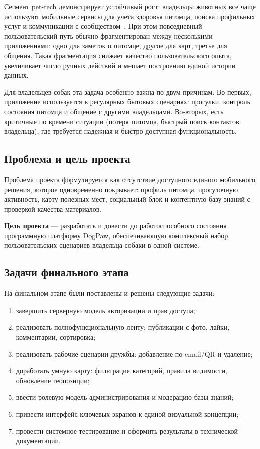 \documentclass[12pt,a4paper]{article}
\begin{document}
Сегмент pet-tech демонстрирует устойчивый рост: владельцы животных все чаще используют мобильные сервисы для учета здоровья питомца, поиска профильных услуг и коммуникации с сообществом~\cite{statista_pet}. При этом повседневный пользовательский путь обычно фрагментирован между несколькими приложениями: одно для заметок о питомце, другое для карт, третье для общения. Такая фрагментация снижает качество пользовательского опыта, увеличивает число ручных действий и мешает построению единой истории данных.

Для владельцев собак эта задача особенно важна по двум причинам. Во-первых, приложение используется в регулярных бытовых сценариях: прогулки, контроль состояния питомца и общение с другими владельцами. Во-вторых, есть критичные по времени ситуации (потеря питомца, быстрый поиск контактов владельца), где требуется надежная и быстро доступная функциональность.

\subsection{Проблема и цель проекта}

Проблема проекта формулируется как отсутствие доступного единого мобильного решения, которое одновременно покрывает: профиль питомца, прогулочную активность, карту полезных мест, социальный блок и контентную базу знаний с проверкой качества материалов.

\textbf{Цель проекта} --- разработать и довести до работоспособного состояния программную платформу DogPaw, обеспечивающую комплексный набор пользовательских сценариев владельца собаки в одной системе.

\subsection{Задачи финального этапа}

На финальном этапе были поставлены и решены следующие задачи:
\begin{enumerate}
  \item завершить серверную модель авторизации и прав доступа;
  \item реализовать полнофункциональную ленту: публикации с фото, лайки, комментарии, сортировка;
  \item реализовать рабочие сценарии дружбы: добавление по email/QR и удаление;
  \item доработать умную карту: фильтрация категорий, правила видимости, обновление геопозиции;
  \item ввести ролевую модель администрирования и модерацию базы знаний;
  \item привести интерфейс ключевых экранов к единой визуальной концепции;
  \item провести системное тестирование и оформить результаты в технической документации.
\end{enumerate}
\end{document}
